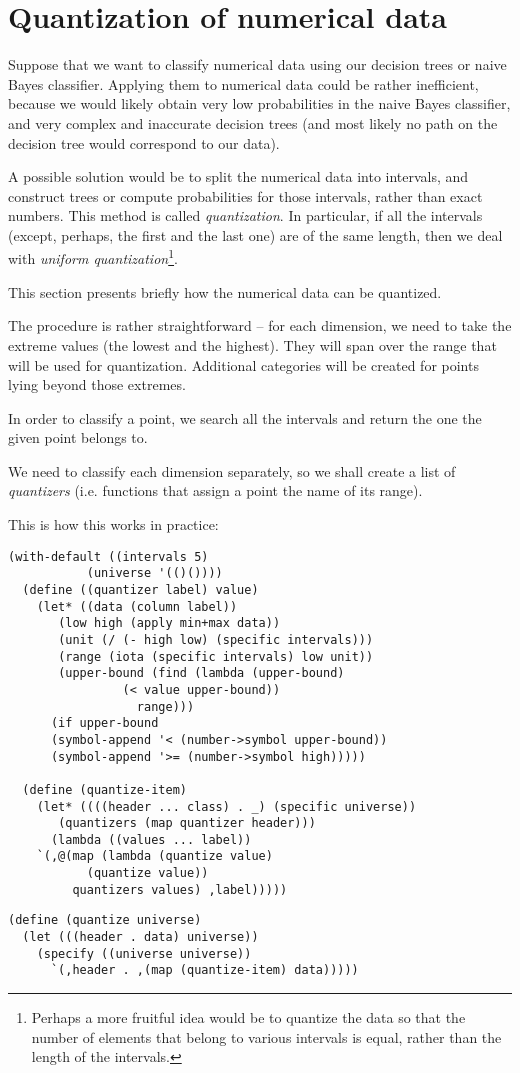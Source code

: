 \section{Quantization of numerical data}

Suppose that we want to classify numerical data using
our decision trees or naive Bayes classifier. Applying them
to numerical data could be rather inefficient, because we
would likely obtain very low probabilities in the naive
Bayes classifier, and very complex and inaccurate decision
trees (and most likely no path on the decision tree would
correspond to our data).

A possible solution would be to split the numerical data
into intervals, and construct trees or compute probabilities
for those intervals, rather than exact numbers. This method
is called \textit{quantization}. In particular, if all 
the intervals (except, perhaps, the first and the last one)
are of the same length, then we deal with \textit{uniform
quantization}\footnote{Perhaps a more fruitful idea would
be to quantize the data so that the number of elements
that belong to various intervals is equal, rather than
the length of the intervals.}.

This section presents briefly how the numerical data
can be quantized.

The procedure is rather straightforward -- for each
dimension, we need to take the extreme values (the
lowest and the highest). They will span over the range
that will be used for quantization. Additional categories
will be created for points lying beyond those extremes.

In order to classify a point, we search all the intervals
and return the one the given point belongs to.

We need to classify each dimension separately, so we
shall create a list of \textit{quantizers} (i.e. functions
that assign a point the name of its range).

This is how this works in practice:

\begin{Verbatim}[samepage=true]
(with-default ((intervals 5)
	       (universe '(()())))
  (define ((quantizer label) value)
    (let* ((data (column label))
	   (low high (apply min+max data))
	   (unit (/ (- high low) (specific intervals)))
	   (range (iota (specific intervals) low unit))
	   (upper-bound (find (lambda (upper-bound)
				(< value upper-bound))
			      range)))
      (if upper-bound
	  (symbol-append '< (number->symbol upper-bound))
	  (symbol-append '>= (number->symbol high)))))

  (define (quantize-item)
    (let* ((((header ... class) . _) (specific universe))
	   (quantizers (map quantizer header)))
      (lambda ((values ... label))
	`(,@(map (lambda (quantize value) 
		   (quantize value))
		 quantizers values) ,label)))))
\end{Verbatim}
\begin{Verbatim}[samepage=true]
(define (quantize universe)
  (let (((header . data) universe))
    (specify ((universe universe))
      `(,header . ,(map (quantize-item) data)))))
\end{Verbatim}

